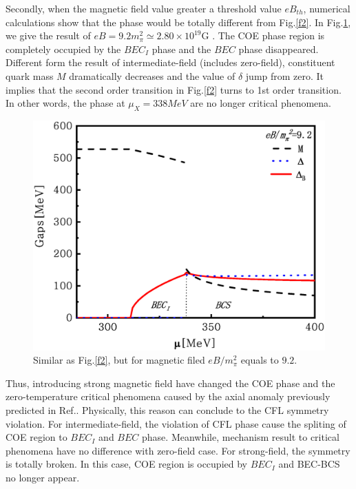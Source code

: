 \documentclass[prd, showpacs,nofootinbib,amsmath,amssymb,12pt]{revtex4}
\begin{document}
Secondly, when the magnetic field value greater a threshold value $eB_{th}$, 
numerical calculations show that the phase would be totally different from Fig.\ref{f2}.
In Fig.\ref{f3}, we give the result of $eB = 9.2m^2_\pi \simeq 2.80\times10^{19}$G .
The COE phase region is completely occupied by the $BEC_I$ phase and the $BEC$ phase disappeared. 
Different form the result of intermediate-field (includes zero-field),
constituent quark mass $M$ dramatically decreases and the value of $\delta$ jump from zero.
It implies that the second order transition in Fig.\ref{f2} turns to 1st order transition.
In other words, the phase at $\mu_X=338MeV$ are no longer critical phenomena.

\begin{figure}[ht]
	\centering
	\includegraphics[scale=0.3]{2.eps}
	\caption{Similar as Fig.\ref{f2}, but for magnetic filed $eB/m^2_\pi$ equals to $9.2$.}
	\label{f3}
\end{figure}

Thus, introducing strong magnetic field have changed the COE phase and the zero-temperature critical phenomena caused by the axial anomaly previously predicted in Ref.\cite{abuki2010nambu}.
Physically, this reason can conclude to the CFL symmetry violation.
For intermediate-field, the violation of CFL phase cause the spliting of COE region to $BEC_I$ and $BEC$ phase.
Meanwhile, mechanism result to critical phenomena have no difference with zero-field case.
For strong-field, the symmetry is totally broken. 
In this case, COE region is occupied by $BEC_I$ and BEC-BCS no longer appear.
\end{document}
